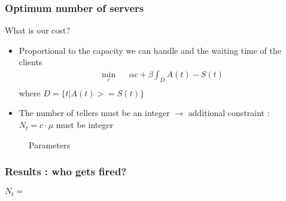 \documentclass[10pt]{beamer}
\begin{document}
\begin{frame}
\frametitle{Optimum number of servers}
\begin{block}{What is our cost?}
\begin{itemize}
\item Proportional to the capacity we can handle and the waiting time of the clients
\begin{eqnarray*}
\min_c & & \alpha c + \beta \int_D A(t)-S(t)\\
\end{eqnarray*}
where $D = \{t | A(t)>=S(t) \}$
\item The number of tellers must be an integer $\rightarrow$ additional constraint : $N_t = c \cdot \mu$ must be integer
\end{itemize}
\end{block}
\begin{figure}
\centering

\caption{Parameters\label{table:param}}
\end{figure}
\end{frame}

\begin{frame}
\frametitle{Results : who gets fired?}
\begin{figure}
\centering
{}
\end{figure}
\begin{center}
$N_t = $ 
\end{center}
\end{frame}
\end{document}
